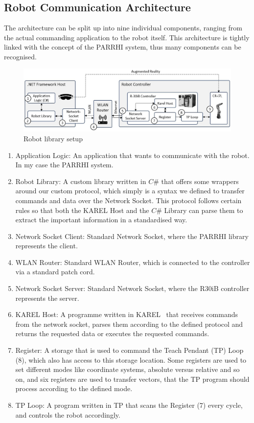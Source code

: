 \subsection{Robot Communication Architecture}

The architecture can be split up into nine individual components, ranging from the actual commanding application to the robot itself. This architecture is tightly linked with the concept of the PARRHI system, thus many components can be recognised.

\begin{figure}
	\centering
	\includegraphics[width=1\textwidth]{Figures/RobotArchitecture.jpg}
	\caption{Robot library setup}
	\label{Fig:RobotArchitecture}
\end{figure}



\begin{enumerate}
	\item Application Logic: An application that wants to communicate with the robot. In my case the PARRHI system.
	\item Robot Library: A custom library written in $C\#$ that offers some wrappers around our custom protocol, which simply is a syntax we defined to transfer commands and data over the Network Socket. This protocol follows certain rules so that both the KAREL Host and the $C\#$ Library can parse them to extract the important information in a standardised way.
	\item Network Socket Client: Standard Network Socket, where the PARRHI library represents the client.
	\item WLAN Router: Standard WLAN Router, which is connected to the controller via a standard patch cord.
	\item Network Socket Server: Standard Network Socket, where the R30iB controller represents the server.
	\item KAREL Host: A programme written in KAREL~\cite{FanucKarel} that receives commands from the network socket, parses them according to the defined protocol and returns the requested data or executes the requested commands.
	\item Register: A storage that is used to command the Teach Pendant (TP) Loop (8), which also has access to this storage location. Some registers are used to set different modes like coordinate systems, absolute versus relative and so on, and six registers are used to transfer vectors, that the TP program should process according to the defined mode.
	\item TP Loop: A program written in TP that scans the Register (7) every cycle, and controls the robot accordingly.
\end{enumerate}

